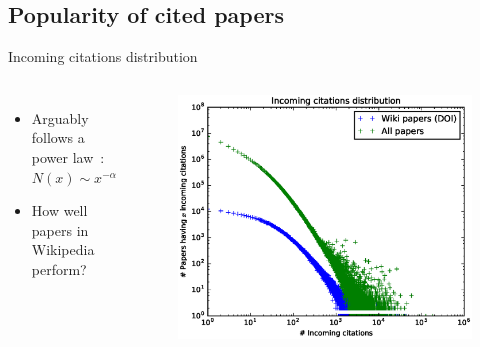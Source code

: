 \documentclass{beamer}
\begin{document}
\subsection{Popularity of cited papers}
\begin{frame}{Incoming citations distribution}
    \begin{columns}
        \begin{itemize}
            \item Arguably follows a power law~\cite{Redner1998}: $N(x) \sim x^{-\alpha}$
            \item How well papers in Wikipedia perform?
        \end{itemize}
        \begin{figure}
        \centering
        \includegraphics[width=1\textwidth]{assets/incoming_citations_distribution_pdf_slides}
        \end{figure}
    \end{columns}

\end{frame}
\end{document}
